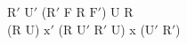 $\text{R}'$ $\text{U}'$ ($\text{R}'$ F R $\text{F}'$) U R\\
(R U) $\text{x}'$ (R $\text{U}'$ $\text{R}'$ U) x ($\text{U}'$ $\text{R}'$)\\
